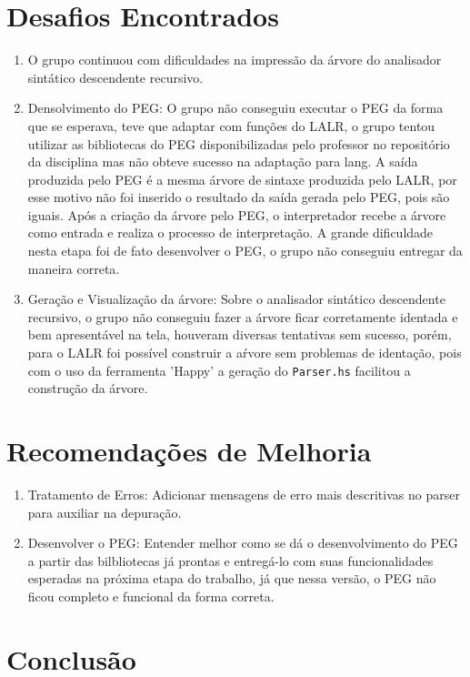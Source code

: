 \documentclass{article}
\begin{document}
\newpage
\section{Desafios Encontrados}
\begin{enumerate}
    \item O grupo continuou com dificuldades na impressão da árvore do analisador sintático descendente recursivo.
    \item Densolvimento do PEG: O grupo não conseguiu executar o PEG da forma que se esperava, teve que adaptar com funções do LALR, o grupo tentou utilizar as bibliotecas do PEG disponibilizadas pelo professor no repositório da disciplina mas não obteve sucesso na adaptação para lang. A saída produzida pelo PEG é a mesma árvore de sintaxe produzida pelo LALR, por esse motivo não foi inserido o resultado da saída gerada pelo PEG, pois são iguais. Após a criação da árvore pelo PEG, o interpretador recebe a árvore como entrada e realiza o processo de interpretação. A grande dificuldade nesta etapa foi de fato desenvolver o PEG, o grupo não conseguiu entregar da maneira correta.
    \item Geração e Visualização da árvore: Sobre o analisador sintático descendente recursivo, o grupo não conseguiu fazer a árvore ficar corretamente identada e bem apresentável na tela, houveram diversas tentativas sem sucesso, porém, para o LALR foi possível construir a aŕvore sem problemas de identação, pois com o uso da ferramenta 'Happy' a geração do \texttt{Parser.hs} facilitou a construção da árvore.
\end{enumerate}

 \section{Recomendações de Melhoria}
 \begin{enumerate}
    \item Tratamento de Erros: Adicionar mensagens de erro mais descritivas no parser para auxiliar na depuração. 
    \item Desenvolver o PEG: Entender melhor como se dá o desenvolvimento do PEG a partir das bilbliotecas já prontas e entregá-lo com suas funcionalidades esperadas na próxima etapa do trabalho, já que nessa versão, o PEG não ficou completo e funcional da forma correta.
 \end{enumerate}

\newpage
\section{Conclusão}
\end{document}
